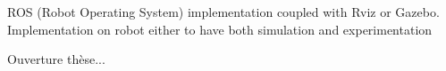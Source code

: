 \documentclass[../main.tex]{subfiles}
\begin{document}
ROS (Robot Operating System) implementation coupled with Rviz or Gazebo. 
Implementation on robot either to have both simulation and experimentation 




Ouverture thèse...
\end{document}
